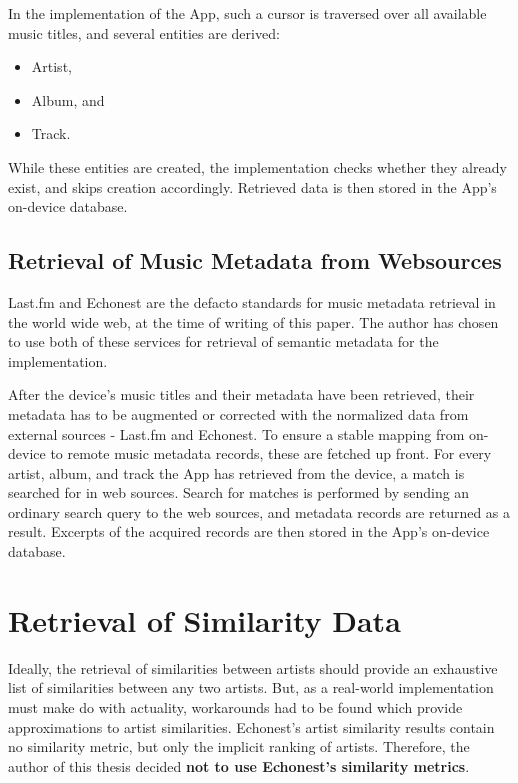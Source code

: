 In the implementation of the App, such a cursor is traversed over all available music titles, and several entities are derived:

\begin{itemize}
	\item Artist,
	\item Album, and
	\item Track.
\end{itemize}

While these entities are created, the implementation checks whether they already exist, and skips creation accordingly. Retrieved data is then stored in the App's on-device database.

\subsection{Retrieval of Music Metadata from Websources}

Last.fm \cite{url:lastfm} and Echonest \cite{url:echonest} are the defacto standards for music metadata retrieval in the world wide web, 
at the time of writing of this paper. The author has chosen to use both of these services for retrieval 
of semantic metadata for the implementation. 

After the device's music titles and their metadata have been retrieved, their metadata has to be augmented or corrected with the normalized data from external sources - Last.fm and Echonest. To ensure a stable mapping from on-device to remote music metadata records, these are fetched up front. For every artist, album, and track the App has retrieved from the device, a match is searched for in web sources. Search for matches is performed by sending an ordinary search query to the web sources, and metadata records are returned as a result. Excerpts of the acquired records are then stored in the App's on-device database.

\section{Retrieval of Similarity Data}

Ideally, the retrieval of similarities between artists should provide an exhaustive list of similarities between any two artists. But, as a real-world implementation must make do with actuality, workarounds had to be found which provide approximations to artist similarities.
Echonest's artist similarity results contain no similarity metric, but only the implicit ranking of artists. Therefore, the author of this thesis decided \textbf{not to use Echonest's similarity metrics}.

